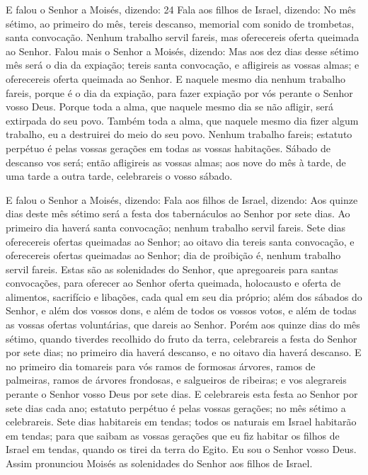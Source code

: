 E falou o Senhor a Moisés, dizendo: 24 Fala aos filhos de Israel,
dizendo: No mês sétimo, ao primeiro do mês, tereis descanso,
memorial com sonido de trombetas, santa convocação. Nenhum
trabalho servil fareis, mas oferecereis oferta queimada ao Senhor.
Falou mais o Senhor a Moisés, dizendo: Mas aos dez
dias desse sétimo mês será o dia da expiação; tereis santa
convocação, e afligireis as vossas almas; e oferecereis oferta
queimada ao Senhor. E naquele mesmo dia nenhum trabalho
fareis, porque é o dia da expiação, para fazer expiação por vós
perante o Senhor vosso Deus. Porque toda a alma, que naquele
mesmo dia se não afligir, será extirpada do seu povo. Também
toda a alma, que naquele mesmo dia fizer algum trabalho, eu a
destruirei do meio do seu povo. Nenhum trabalho fareis;
estatuto perpétuo é pelas vossas gerações em todas as vossas
habitações. Sábado de descanso vos será; então afligireis as
vossas almas; aos nove do mês à tarde, de uma tarde a outra tarde,
celebrareis o vosso sábado.

E falou o Senhor a Moisés, dizendo: Fala aos filhos de
Israel, dizendo: Aos quinze dias deste mês sétimo será a festa dos
tabernáculos ao Senhor por sete dias. Ao primeiro dia haverá
santa convocação; nenhum trabalho servil fareis. Sete dias
oferecereis ofertas queimadas ao Senhor; ao oitavo dia tereis santa
convocação, e oferecereis ofertas queimadas ao Senhor; dia de
proibição é, nenhum trabalho servil fareis. Estas são as
solenidades do Senhor, que apregoareis para santas convocações, para
oferecer ao Senhor oferta queimada, holocausto e oferta de
alimentos, sacrifício e libações, cada qual em seu dia próprio;
além dos sábados do Senhor, e além dos vossos dons, e além de
todos os vossos votos, e além de todas as vossas ofertas
voluntárias, que dareis ao Senhor. Porém aos quinze dias do
mês sétimo, quando tiverdes recolhido do fruto da terra, celebrareis
a festa do Senhor por sete dias; no primeiro dia haverá descanso, e
no oitavo dia haverá descanso. E no primeiro dia tomareis
para vós ramos de formosas árvores, ramos de palmeiras, ramos de
árvores frondosas, e salgueiros de ribeiras; e vos alegrareis
perante o Senhor vosso Deus por sete dias. E celebrareis esta
festa ao Senhor por sete dias cada ano; estatuto perpétuo é pelas
vossas gerações; no mês sétimo a celebrareis. Sete dias
habitareis em tendas; todos os naturais em Israel habitarão em
tendas; para que saibam as vossas gerações que eu fiz habitar
os filhos de Israel em tendas, quando os tirei da terra do Egito. Eu
sou o Senhor vosso Deus. Assim pronunciou Moisés as
solenidades do Senhor aos filhos de Israel.

